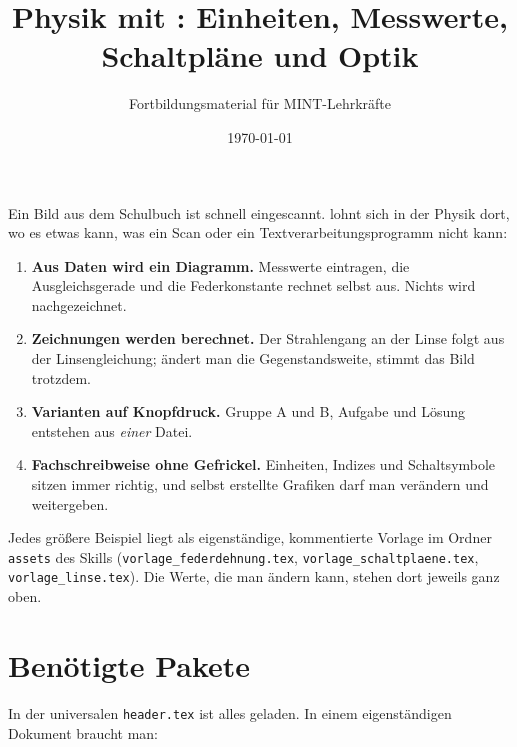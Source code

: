 



\title{Physik mit : Einheiten, Messwerte, Schaltpläne und Optik}
\author{Fortbildungsmaterial für MINT-Lehrkräfte}
\date{\today}
\pagestyle{plain}
\setlength{\parskip}{1.5em} %
\setlength{\emergencystretch}{4em} %




\maketitle

Ein Bild aus dem Schulbuch ist schnell eingescannt.  lohnt sich in der Physik dort, wo es etwas kann, was ein Scan oder ein Textverarbeitungsprogramm nicht kann:

\begin{enumerate}
	\item \textbf{Aus Daten wird ein Diagramm.} Messwerte eintragen, die Ausgleichsgerade und die Federkonstante rechnet  selbst aus. Nichts wird nachgezeichnet.
	\item \textbf{Zeichnungen werden berechnet.} Der Strahlengang an der Linse folgt aus der Linsengleichung; ändert man die Gegenstandsweite, stimmt das Bild trotzdem.
	\item \textbf{Varianten auf Knopfdruck.} Gruppe A und B, Aufgabe und Lösung entstehen aus \textit{einer} Datei.
	\item \textbf{Fachschreibweise ohne Gefrickel.} Einheiten, Indizes und Schaltsymbole sitzen immer richtig, und selbst erstellte Grafiken darf man verändern und weitergeben.
\end{enumerate}

Jedes größere Beispiel liegt als eigenständige, kommentierte Vorlage im Ordner \texttt{assets} des Skills (\texttt{vorlage\_federdehnung.tex}, \texttt{vorlage\_schaltplaene.tex}, \texttt{vorlage\_linse.tex}). Die Werte, die man ändern kann, stehen dort jeweils ganz oben.

\tableofcontents



\section{Benötigte Pakete}

In der universalen \texttt{header.tex} ist alles geladen. In einem eigenständigen Dokument braucht man:

